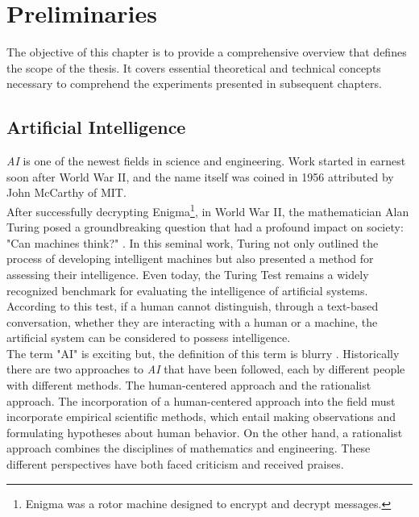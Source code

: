 \chapter{Preliminaries}
\label{cap:prelim}

The objective of this chapter is to provide a comprehensive overview that defines the scope of the thesis.
It covers essential theoretical and technical concepts necessary to comprehend the experiments presented in subsequent chapters.

\section{Artificial Intelligence}

\textit{AI} is one of the newest fields in science and engineering. Work started in earnest soon
after World War II, and the name itself was coined in 1956 attributed by John McCarthy of MIT. \\

After successfully decrypting Enigma\footnote{Enigma was a rotor machine designed to encrypt and decrypt messages.}, in World War II, the mathematician Alan Turing posed a groundbreaking question that had a profound impact on society: "Can machines think?" \cite{CanMachineThink}. In this seminal work, Turing not only outlined the process of developing intelligent machines but also presented a method for assessing their intelligence. Even today, the Turing Test remains a widely recognized benchmark for evaluating the intelligence of artificial systems. According to this test, if a human cannot distinguish, through a text-based conversation, whether they are interacting with a human or a machine, the artificial system can be considered to possess intelligence. \\

The term "AI" is exciting but, the definition of this term is blurry \cite{AIModernApprouch}.
Historically there are two approaches to \textit{AI} that have been followed, each by different people
with different methods. The human-centered approach and the rationalist approach. The incorporation of a human-centered approach into the field must incorporate empirical scientific methods, which entail making observations and formulating hypotheses about human behavior. On the other hand, a rationalist approach combines the disciplines of mathematics and engineering. These different perspectives have both faced criticism and received praises. \\


